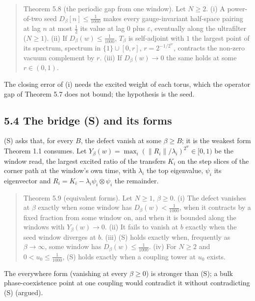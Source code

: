 \documentclass[10pt,letterpaper,twocolumn]{article}
\begin{document}
\begin{quote}
Theorem 5.8 (the periodic gap from one window). Let \(N\ge2\). (i) A power-of-two seed \(D_\beta[n]\le\tfrac1{1000}\) makes every gauge-invariant half-space pairing at lag \(n\) at most \(\tfrac12\) its value at lag \(0\) plus \(\varepsilon\), eventually along the ultrafilter (\(N\ge1\)). (ii) If \(D_\beta(w)\le\tfrac1{1000}\), \(T_\beta\) is self-adjoint with \(1\) the largest point of its spectrum, spectrum in \(\{1\}\cup[0,r]\), \(r=2^{-1/2^w}\), contracts the non-zero vacuum complement by \(r\). (iii) If \(D_\beta(w)\to0\) the same holds at some \(r\in(0,1)\).
\end{quote}

The closing error of (i) needs the excited weight of each torus, which the operator gap of Theorem 5.7 does not bound; the hypothesis is the seed.

\subsection{5.4 The bridge (S) and its forms}\label{54-the-bridge-s-and-its-forms}

(S) asks that, for every \(B\), the defect vanish at some \(\beta\ge B\); it is the weakest form Theorem 1.1 consumes. Let \(Y_\beta(w)=\max_i(\|R_i\|/\lambda_i)^{2^w}\in[0,1)\) be the window read, the largest excited ratio of the transfers \(K_i\) on the step slices of the corner path at the window's own time, with \(\lambda_i\) the top eigenvalue, \(\psi_i\) its eigenvector and \(R_i=K_i-\lambda_i\psi_i\otimes\psi_i\) the remainder.

\begin{quote}
Theorem 5.9 (equivalent forms). Let \(N\ge1\), \(\beta\ge0\). (i) The defect vanishes at \(\beta\) exactly when some window has \(D_\beta(w)<\tfrac1{1000}\), when it contracts by a fixed fraction from some window on, and when it is bounded along the windows with \(Y_\beta(w)\to0\). (ii) It fails to vanish at \(b\) exactly when the seed window diverges at \(b\). (iii) (S) holds exactly when, frequently as \(\beta\to\infty\), some window has \(D_\beta(w)\le\tfrac1{1000}\). (iv) For \(N\ge2\) and \(0<u_0\le\tfrac1{1000}\), (S) holds exactly when a coupling tower at \(u_0\) exists.
\end{quote}

The everywhere form (vanishing at every \(\beta\ge0\)) is stronger than (S); a bulk phase-coexistence point at one coupling would contradict it without contradicting (S) (argued).
\end{document}
